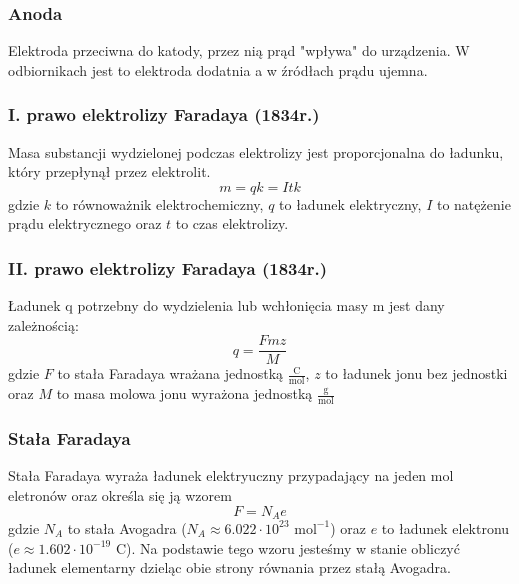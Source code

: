 \documentclass[a4paper,12pts]{article}
\begin{document}
			\subsubsection{Anoda}
			Elektroda przeciwna do katody, przez nią prąd "wpływa" do urządzenia. W odbiornikach jest to elektroda dodatnia a w źródłach prądu ujemna.
			
			\subsubsection{I. prawo elektrolizy Faradaya (1834r.)}
			Masa substancji wydzielonej podczas elektrolizy jest proporcjonalna do ładunku, który przepłynął przez elektrolit.
			\begin{equation}
				m = qk = Itk
			\end{equation}
			gdzie $k$ to równoważnik elektrochemiczny, $q$ to ładunek elektryczny, $I$ to natężenie prądu elektrycznego oraz $t$ to czas elektrolizy.
			
			\subsubsection{II. prawo elektrolizy Faradaya (1834r.)}
			Ładunek q potrzebny do wydzielenia lub wchłonięcia masy m jest dany zależnością:
			\begin{equation}
				q = \frac{Fmz}{M}
			\end{equation}
			gdzie $F$ to stała Faradaya wrażana jednostką $\frac{\textrm{C}}{\textrm{mol}}$, $z$ to ładunek jonu bez jednostki oraz $M$ to masa molowa jonu wyrażona jednostką $\frac{\textrm{g}}{\textrm{mol}}$
			
			\subsubsection{Stała Faradaya}
			Stała Faradaya wyraża ładunek elektryuczny przypadający na jeden mol eletronów oraz określa się ją wzorem
			\begin{equation}
				F = N_A e
			\end{equation}
			gdzie $N_A$ to stała Avogadra ($N_A \approx 6.022 \cdot 10^{23} \textrm{ mol}^{-1}$) oraz $e$ to ładunek elektronu ($e \approx 1.602 \cdot 10^{-19} \textrm{ C}$). Na podstawie tego wzoru jesteśmy w stanie obliczyć ładunek elementarny dzieląc obie strony równania przez stałą Avogadra.
	
	
\end{document}
